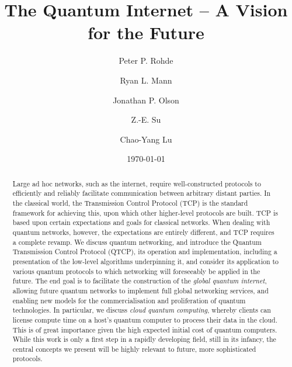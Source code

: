 \documentclass[aps,rmp,twocolumn,amsmath,amssymb,nofootinbib,superscriptaddress]{revtex4}
\begin{document}


%
%

\title{The Quantum Internet -- A Vision for the Future}

%
%

\author{Peter P. Rohde}

\author{Ryan L. Mann}

\author{Jonathan P. Olson}

\author{Z.-E. Su}

\author{Chao-Yang Lu}

\date{\today}

\frenchspacing

%
%

\begin{abstract}
Large ad hoc networks, such as the internet, require well-constructed protocols to efficiently and reliably facilitate communication between arbitrary distant parties. In the classical world, the Transmission Control Protocol (TCP) is the standard framework for achieving this, upon which other higher-level protocols are built. TCP is based upon certain expectations and goals for classical networks. When dealing with quantum networks, however, the expectations are entirely different, and TCP requires a complete revamp. We discuss quantum networking, and introduce the Quantum Transmission Control Protocol (QTCP), its operation and implementation, including a presentation of the low-level algorithms underpinning it, and consider its application to various quantum protocols to which networking will foreseeably be applied in the future. The end goal is to facilitate the construction of the \emph{global quantum internet}, allowing future quantum networks to implement full global networking services, and enabling new models for the commercialisation and proliferation of quantum technologies. In particular, we discuss \emph{cloud quantum computing}, whereby clients can license compute time on a host's quantum computer to process their data in the cloud. This is of great importance given the high expected initial cost of quantum computers. While this work is only a first step in a rapidly developing field, still in its infancy, the central concepts we present will be highly relevant to future, more sophisticated protocols.
\end{abstract}
\end{document}
